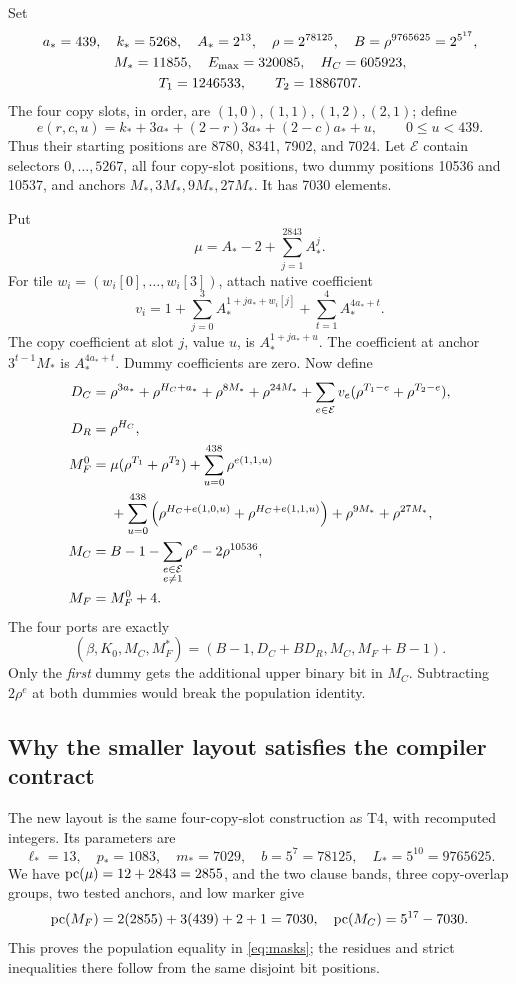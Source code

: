 \documentclass[11pt]{article}
\theoremstyle{definition}\newtheorem{definition}[theorem]{Definition}
\theoremstyle{remark}\newtheorem{remark}[theorem]{Remark}
\begin{document}
Set
\begin{gather}
a_* =439,\quad k_*=5268,\quad A_*=2^{13},\quad
\rho=2^{78125},\quad B=\rho^{9765625}=2^{5^{17}},\label{eq:baseradix}\\
M_*=11855,\quad E_{\max}=320085,\quad H_C=605923,\notag\\
T_1=1246533,\qquad T_2=1886707.\notag
\end{gather}
The four copy slots, in order, are $(1,0),(1,1),(1,2),(2,1)$; define
\[
e(r,c,u)=k_*+3a_*+(2-r)3a_*+(2-c)a_*+u,
\qquad0\le u<439.
\]
Thus their starting positions are 8780, 8341, 7902, and 7024. Let $\mathcal E$ contain selectors $0,\ldots,5267$, all four copy-slot positions, two dummy positions 10536 and 10537, and anchors $M_*,3M_*,9M_*,27M_*$. It has 7030 elements.

Put
\[
\mu=A_*-2+\sum_{j=1}^{2843}A_*^j.
\]
For tile $w_i=(w_i[0],\ldots,w_i[3])$, attach native coefficient
\[
v_i=1+\sum_{j=0}^{3}A_*^{1+ja_*+w_i[j]}
          +\sum_{t=1}^4A_*^{4a_*+t}.
\]
The copy coefficient at slot $j$, value $u$, is $A_*^{1+ja_*+u}$. The coefficient at anchor $3^{t-1}M_*$ is $A_*^{4a_*+t}$. Dummy coefficients are zero. Now define
\begin{align}
D_C={}&\rho^{3a_*}+\rho^{H_C+a_*}+\rho^{8M_*}+\rho^{24M_*}
 +\sum_{e\in\mathcal E}v_e(\rho^{T_1-e}+\rho^{T_2-e}),\notag\\
D_R={}&\rho^{H_C},\notag\\
M_F^0={}&\mu(\rho^{T_1}+\rho^{T_2})
       +\sum_{u=0}^{438}\rho^{e(1,1,u)}\notag\\
 &+\sum_{u=0}^{438}\left(\rho^{H_C+e(1,0,u)}+
                              \rho^{H_C+e(1,1,u)}\right)
       +\rho^{9M_*}+\rho^{27M_*},\notag\\
M_C={}&B-1-\sum_{\substack{e\in\mathcal E\\e\ne1}}\rho^e
                      -2\rho^{10536},\notag\\
M_F={}&M_F^0+4.\label{eq:coefficients}
\end{align}
The four ports are exactly
\begin{equation}
\boxed{(\beta,K_0,M_C,M_F^*)=(B-1,D_C+BD_R,M_C,M_F+B-1).}\label{eq:ports}
\end{equation}
Only the \emph{first} dummy gets the additional upper binary bit in $M_C$. Subtracting $2\rho^e$ at both dummies would break the population identity.

\subsection{Why the smaller layout satisfies the compiler contract}
The new layout is the same four-copy-slot construction as T4, with recomputed integers. Its parameters are
\[
\ell_*=13,\quad p_*=1083,\quad m_*=7029,\quad
b=5^7=78125,\quad L_*=5^{10}=9765625.
\]
We have $\operatorname{pc}(\mu)=12+2843=2855$, and the two clause bands, three copy-overlap groups, two tested anchors, and low marker give
\[
\operatorname{pc}(M_F)=2(2855)+3(439)+2+1=7030,
\quad\operatorname{pc}(M_C)=5^{17}-7030.
\]
This proves the population equality in \eqref{eq:masks}; the residues and strict inequalities there follow from the same disjoint bit positions.
\end{document}

